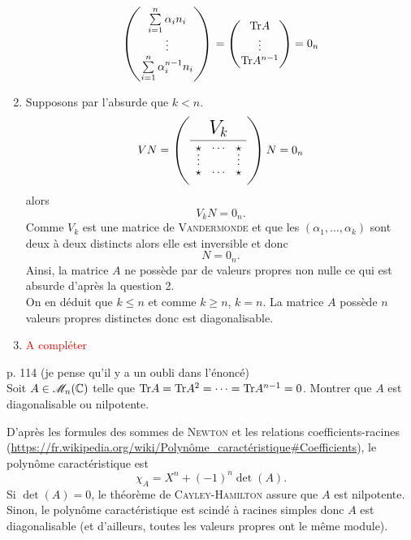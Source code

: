 \begin{solution}
\begin{enumerate}
\begin{align*}
\begin{pmatrix}
                \sum\limits_{i=1}^n \alpha_i n_i \\ \vdots \\ \sum\limits_{i=1}^n \alpha_i^{n-1} n_i
            \end{pmatrix}
            = 
            \begin{pmatrix}
                \mathrm{Tr}{A} \\ \vdots \\ \mathrm{Tr}{A^{n-1}}
            \end{pmatrix}
            =
            0_n
        \end{align*}
        \item Supposons par l'absurde que $k < n$. \\
        $$V N = \vandermondepartiel N = 0_n$$
        alors 
        $$V_k N = 0_n.$$
        Comme $V_k$ est une matrice de \textsc{Vandermonde} et que les $(\alpha_1, \dots, \alpha_k)$ sont deux à deux distincts alors elle est inversible et donc
        $$N = 0_n.$$
        Ainsi, la matrice $A$ ne possède par de valeurs propres non nulle ce qui est absurde d'après la question 2. \\
        On en déduit que $k \leqslant n$ et comme $k \geqslant n$, $k=n$. La matrice $A$ possède $n$ valeurs propres distinctes donc est diagonalisable.
        \item \textcolor{red}{A compléter}
        \end{enumerate}
\end{solution}

\begin{exercice}
    \cite{reduc_des_endo} p. 114 (je pense qu'il y a un oubli dans l'énoncé)\\
    Soit $A \in \mathscr{M}_n(\mathbb{C})$ telle que $\mathrm{Tr}{A} = \mathrm{Tr}{A^2} = \cdots = \mathrm{Tr}{A^{n-1}} = 0$. Montrer que $A$ est diagonalisable ou nilpotente. 
\end{exercice}

\begin{elem_sol}
    D'après les formules des sommes de \textsc{Newton} et les relations coefficients-racines (\url{https://fr.wikipedia.org/wiki/Polynôme_caractéristique#Coefficients}), le polynôme caractéristique est 
    $$\chi_A = X^n + (-1)^n \det(A).$$
    Si $\det(A) = 0$, le théorème de \textsc{Cayley}-\textsc{Hamilton} assure que $A$ est nilpotente. Sinon, le polynôme caractéristique est scindé à racines simples donc $A$ est diagonalisable (et d'ailleurs, toutes les valeurs propres ont le même module).
\end{elem_sol}